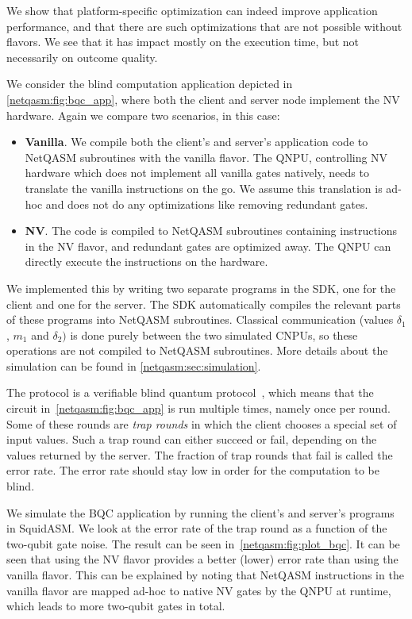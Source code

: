 We show that platform-specific optimization can indeed improve application performance, and that there are such optimizations that are not possible without flavors.
We see that it has impact mostly on the execution time, but not necessarily on outcome quality.

We consider the blind computation application depicted in \cref{netqasm:fig:bqc_app}, where both the client and server node implement the NV hardware.
Again we compare two scenarios, in this case:
\begin{itemize}
  \item \textbf{Vanilla}.
        We compile both the client's and server's application code to \ac{NetQASM} subroutines with the vanilla flavor.
        The \ac{QNPU}, controlling NV hardware which does not implement all vanilla gates natively, needs to translate the vanilla instructions on the go.
        We assume this translation is ad-hoc and does not do any optimizations like removing redundant gates.
  \item \textbf{NV}.
        The code is compiled to \ac{NetQASM} subroutines containing instructions in the NV flavor, and redundant gates are optimized away.
        The \ac{QNPU} can directly execute the instructions on the hardware.
\end{itemize}

We implemented this by writing two separate programs in the SDK, one for the client and one for the server.
The SDK automatically compiles the relevant parts of these programs into \ac{NetQASM} subroutines.
Classical communication (values $\delta_1$, $m_1$ and $\delta_2)$ is done purely between the two simulated \ac{CNPU}s, so these operations are not compiled to \ac{NetQASM} subroutines.
More details about the simulation can be found in \cref{netqasm:sec:simulation}.

The protocol is a verifiable blind quantum protocol~\cite{fitzsimons2017unconditionally}, which means that the circuit in~\cref{netqasm:fig:bqc_app} is run multiple times, namely once per round.
Some of these rounds are \textit{trap rounds} in which the client chooses a special set of input values.
Such a trap round can either succeed or fail, depending on the values returned by the server.
The fraction of trap rounds that fail is called the error rate.
The error rate should stay low in order for the computation to be blind.

We simulate the BQC application by running the client's and server's programs in SquidASM.
We look at the error rate of the trap round as a function of the two-qubit gate noise.
The result can be seen in~\cref{netqasm:fig:plot_bqc}.
It can be seen that using the NV flavor provides a better (lower) error rate than using the vanilla flavor.
This can be explained by noting that \ac{NetQASM} instructions in the vanilla flavor are mapped ad-hoc to native NV gates by the \ac{QNPU} at runtime, which leads to more two-qubit gates in total.


